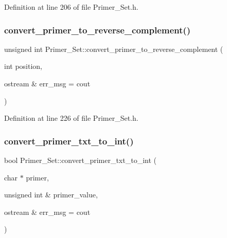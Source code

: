 Definition at line 206 of file Primer\+\_\+\+Set.\+h.

\mbox{\label{class_primer___set_a6f351e7eb9dc3ceb42beb4fcd368e616}} 
\subsubsection{\texorpdfstring{convert\+\_\+primer\+\_\+to\+\_\+reverse\+\_\+complement()}{convert\_primer\_to\_reverse\_complement()}}
{\footnotesize\ttfamily unsigned int Primer\+\_\+\+Set\+::convert\+\_\+primer\+\_\+to\+\_\+reverse\+\_\+complement (\begin{DoxyParamCaption}\item[{int}]{position,  }\item[{ostream \&}]{err\+\_\+msg = {\ttfamily cout} }\end{DoxyParamCaption})}



Definition at line 226 of file Primer\+\_\+\+Set.\+h.

\mbox{\label{class_primer___set_a0691f55ba1bb6e1dca8fcd5cdfd6bd1a}} 
\subsubsection{\texorpdfstring{convert\+\_\+primer\+\_\+txt\+\_\+to\+\_\+int()}{convert\_primer\_txt\_to\_int()}}
{\footnotesize\ttfamily bool Primer\+\_\+\+Set\+::convert\+\_\+primer\+\_\+txt\+\_\+to\+\_\+int (\begin{DoxyParamCaption}\item[{char $\ast$}]{primer,  }\item[{unsigned int \&}]{primer\+\_\+value,  }\item[{ostream \&}]{err\+\_\+msg = {\ttfamily cout} }\end{DoxyParamCaption})}



